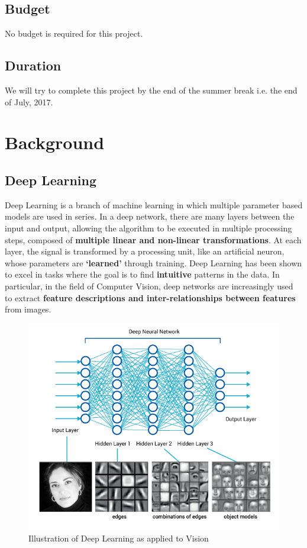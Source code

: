 \documentclass[11pt]{article}
\begin{document}
		\subsection{Budget}
			No budget is required for this project.			
					
		\subsection{Duration}
			We will try to complete this project by the end of the summer break i.e. the end of July, 2017. 

	\section{Background} 
			\subsection{Deep Learning}
				Deep Learning is a branch of machine learning in which multiple parameter based models are used in series. In a deep network, there are many layers between the input and output, allowing the algorithm to be executed in multiple processing steps, composed of \textbf{multiple linear and non-linear transformations}. At each layer, the signal is transformed by a processing unit, like an artificial neuron, whose parameters are \textbf{`learned'} through training. Deep Learning has been shown to excel in tasks where the goal is to find \textbf{intuitive} patterns in the data.\cite{deep} In particular, in the field of Computer Vision, deep networks are increasingly used to extract \textbf{feature descriptions and inter-relationships between features} from images.\cite{cs231n}
				\begin{figure}[ht!]
					\includegraphics[width=14cm]{blog_deeplearning3.jpg}
					\caption{Illustration of Deep Learning as applied to Vision\label{fig2}}
				\end{figure}	
\end{document}
